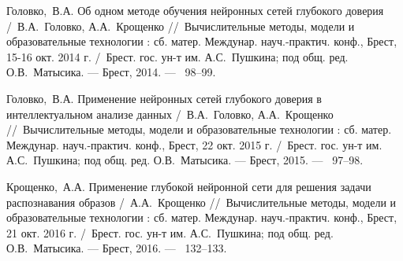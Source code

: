 Головко,~В.А. Об одном методе обучения нейронных сетей глубокого доверия /~В.А.~Головко, А.А.~Крощенко
\newblock //~Вычислительные методы, модели и образовательные технологии : сб. матер. Междунар. науч.-практич. конф., Брест, 15-16 окт. 2014 г.
\newblock /~Брест. гос. ун-т им. А.С.~Пушкина; под общ. ред. О.В.~Матысика. ---
\newblock Брест, 2014. ---
~98--99.

Головко,~В.А. Применение нейронных сетей глубокого доверия в интеллектуальном анализе данных /~В.А.~Головко, А.А.~Крощенко
\newblock //~Вычислительные методы, модели и образовательные технологии : сб. матер. Междунар. науч.-практич. конф., Брест, 22 окт. 2015 г.
\newblock /~Брест. гос. ун-т им. А.С.~Пушкина; под общ. ред. О.В.~Матысика. ---
\newblock Брест, 2015. ---
~97--98.

Крощенко,~А.А. Применение глубокой нейронной сети для решения задачи распознавания образов /~А.А.~Крощенко
\newblock //~Вычислительные методы, модели и образовательные технологии : сб. матер. Междунар. науч.-практич. конф., Брест, 21 окт. 2016 г.
\newblock /~Брест. гос. ун-т им. А.С.~Пушкина; под общ. ред. О.В.~Матысика. ---
\newblock Брест, 2016. ---
~132--133.




